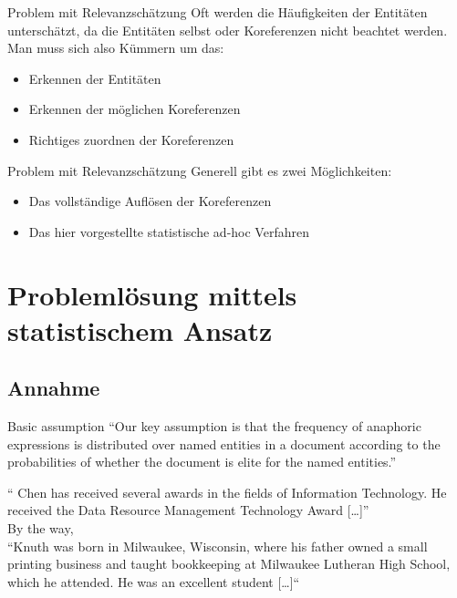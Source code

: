 \documentclass{beamer}
\newcommand{\textnamedentity}{\color{black}}
\newcommand{\textbackground}{\color{gray}}
\newcommand{\textanapher}{\color{blue}}
\begin{document}
\begin{frame}{Problem mit Relevanzschätzung}
	Oft werden die Häufigkeiten der Entitäten unterschätzt, da die Entitäten selbst oder Koreferenzen nicht beachtet werden. Man muss sich also Kümmern um das:
	  \begin{itemize}
		  \item Erkennen der Entitäten
		  \item Erkennen der möglichen Koreferenzen
		  \item Richtiges zuordnen der Koreferenzen
	  \end{itemize}


\end{frame}


\begin{frame}{Problem mit Relevanzschätzung}
	Generell gibt es zwei Möglichkeiten:
	\begin{itemize}
		\item Das vollständige Auflösen der Koreferenzen
		\item Das hier vorgestellte statistische ad-hoc Verfahren
	\end{itemize}

\end{frame}




\section{Problemlösung mittels statistischem Ansatz}

\subsection{Annahme}
\begin{frame}
	\begin{block}{Basic assumption}
		``Our key assumption is that the frequency of anaphoric expressions is distributed over named entities in a document according to the probabilities of whether the document is elite for the named entities.''
		\cite{paper:NaNg}
	\end{block}
	\textbackground `` \textnamedentity Chen \textbackground has received several awards in the fields of Information Technology. \textanapher He \textbackground received the Data Resource Management Technology Award [\ldots]''
	\cite{wiki:PeterChen}
	\\
	By the way,
	\\
	\textbackground ``\textnamedentity Knuth \textbackground was born in Milwaukee, Wisconsin, where \textanapher his \textbackground father owned a small printing business and taught bookkeeping at Milwaukee Lutheran High School, which \textanapher he \textbackground attended. \textanapher He \textbackground was an excellent student [\ldots]``
	\cite{wiki:DonaldKnuth}


\end{frame}
\end{document}
